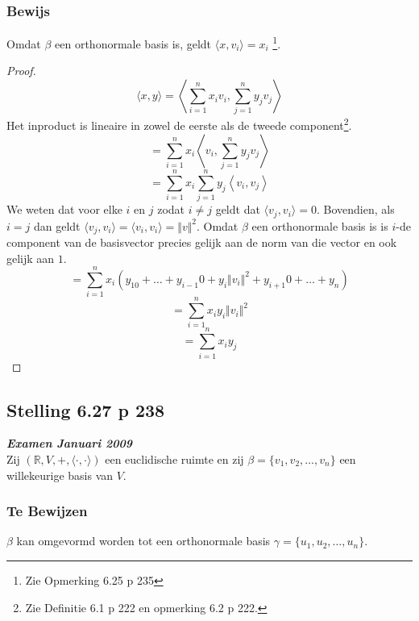\documentclass[lineaire_algebra_oplossingen.tex]{subfiles}
\begin{document}
\subsubsection*{Bewijs}
Omdat $\beta$ een orthonormale basis is, geldt $\langle x, v_i \rangle = x_i$ \footnote{Zie Opmerking 6.25 p 235}.
\begin{proof}
\[
\langle x,y\rangle = \left\langle \sum_{i=1}^nx_iv_i,\sum_{j=1}^ny_jv_j \right\rangle
\]
Het inproduct is lineaire in zowel de eerste als de tweede component\footnote{Zie Definitie 6.1 p 222 en opmerking 6.2 p 222.}.
\[
= \sum_{i=1}^nx_i \left\langle v_i,\sum_{j=1}^ny_jv_j \right\rangle
\]
\[
= \sum_{i=1}^nx_i \sum_{j=1}^n y_j \left\langle v_i,v_j \right\rangle
\]
We weten dat voor elke $i$ en $j$ zodat $i\neq j$ geldt dat $\langle v_j, v_i \rangle = 0$. Bovendien, als $i=j$ dan geldt $\langle v_j, v_i \rangle = \langle v_i, v_i \rangle = \Vert v\Vert^2$.
Omdat $\beta$ een orthonormale basis is is $i$-de component van de basisvector precies gelijk aan de norm van die vector en ook gelijk aan $1$. 
\[
= \sum_{i=1}^nx_i  (y_10+\ldots+y_{i-1}0+y_i\Vert v_i\Vert^2+y_{i+1}0+\ldots+y_n)
\]
\[
= \sum_{i=1}^n x_i y_i \Vert v_i\Vert^2
\]
\[
= \sum_{i=1}^nx_i y_j
\]
\end{proof}


\subsection{Stelling 6.27 p 238}
\label{6.27}
\textit{\textbf{Examen Januari 2009}}\\
Zij $(\mathbb{R}, V,+, \langle \cdot,\cdot \rangle)$ een euclidische ruimte en zij $\beta = \{v_1,v_2,\ldots,v_n\}$ een willekeurige basis van $V$.

\subsubsection*{Te Bewijzen}
$\beta$ kan omgevormd worden tot een orthonormale basis $\gamma = \{u_1,u_2,\ldots,u_n\}$.
\end{document}
